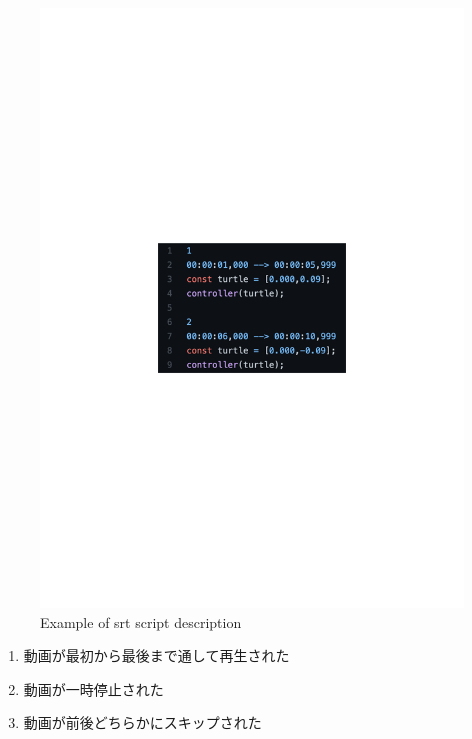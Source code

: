 \documentclass{ujarticle}
\begin{document}
\begin{figure}[t]
  \centering
  \includegraphics[keepaspectratio, scale=0.7]{./src/srt_example.pdf}
  \caption{Example of srt script description}
  \label{fig:srt_example}
\end{figure}

\begin{enumerate}
  \item 動画が最初から最後まで通して再生された
  \item 動画が一時停止された
  \item 動画が前後どちらかにスキップされた
\end{enumerate}
\end{document}
